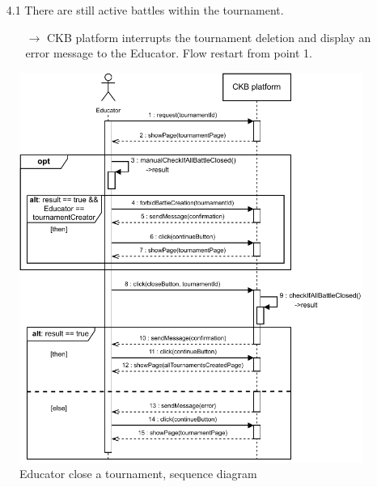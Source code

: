 \documentclass{article}
\begin{document}
{\begin{enumerate}
\begin{xltabular}{\textwidth}
\begin{itemize}
                        \begin{itemize}
                            \item[$\rightarrow$] Educator can close the possibility of
                                  other educators to create new battles if he's the tournament
                                  creator. The flow restart from point 1.
                        \end{itemize}
                  \item[4.1] There are still active battles within the tournament.
                        \begin{itemize}
                            \item[$\rightarrow$] CKB platform interrupts the tournament
                                  deletion and display an error message to the Educator. Flow
                                  restart from point 1.
                        \end{itemize}
              \end{itemize}
          \end{xltabular}

          \begin{figure}[H]
              \centering
              \includegraphics[scale=0.95]{images/SequenceDiagrams/Sequence7.pdf}
              \caption{Educator close a tournament, sequence diagram}
              \label{fig:TournamentClosingSeqDiagram}
          \end{figure}


\end{enumerate}}
\end{document}
